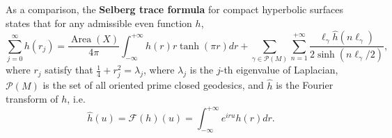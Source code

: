 \documentclass{article}
\begin{document}
\begin{remark}\label{rmk:comparison}
As a comparison, the \textbf{Selberg trace formula} for compact hyperbolic surfaces \cite{Sel56,Bus92} states that for any admissible even function $h$,
\begin{equation}\label{Seltrace}
\sum_{j=0}^{\infty} h\left(r_j\right)=\frac{\operatorname{Area}(X)}{4 \pi} \int_{-\infty}^{+\infty} h(r) r \tanh (\pi r) d r+\sum_{\gamma \in \mathcal{P}(M)} \sum_{n=1}^{+\infty} \frac{\ell_\gamma \hat{h}\left(n \ell_\gamma\right)}{2 \sinh \left(n \ell_\gamma / 2\right)},
\end{equation}
where $r_{j}$ satisfy that $\frac{1}{4}+r_{j}^2=\lambda_{j}$, where $\lambda_{j}$ is the $j$-th eigenvalue of Laplacian, $\mathcal{P}(M)$ is the set of all oriented prime closed
geodesics, and $\hat{h}$ is the Fourier transform of $h$, i.e. $$\hat{h}(u)=\mathcal{F}(h)(u)=\int_{-\infty}^{+\infty} e^{iru} h(r) d r.$$
\end{remark}
\end{document}
